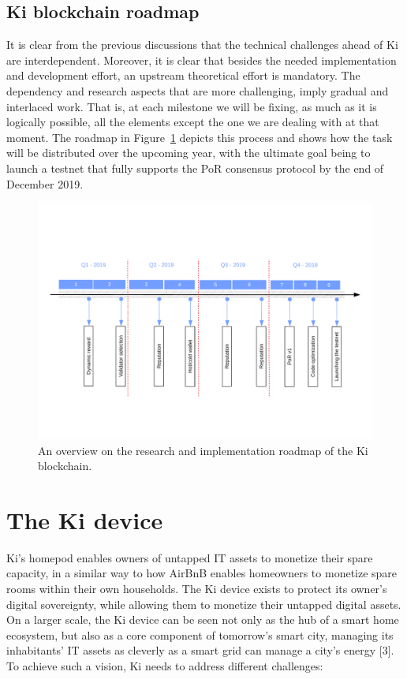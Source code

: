 \subsection{Ki blockchain roadmap}
\label{sec:kiblockchainroad}
It is clear from the previous discussions that the technical challenges ahead of Ki are interdependent. Moreover, it is clear that besides the needed implementation and development effort, an upstream theoretical effort is mandatory. The dependency and research aspects that are more challenging, imply gradual and interlaced work. That is, at each milestone we will be fixing, as much as it is logically possible, all the elements except the one we are dealing with at that moment. The roadmap in Figure~\ref{fig:roadmap} depicts this process and shows how the task will be distributed over the upcoming year, with the ultimate goal being to launch a testnet that fully supports the PoR consensus protocol by the end of December 2019.
\begin{figure}[h]
	\includegraphics[width=\linewidth, trim= 1cm 3cm 1cm 3.5cm, clip]{Figures/Roadmap_f.pdf}
	\caption{An overview on the research and implementation roadmap of the Ki blockchain.}
	\label{fig:roadmap}
\end{figure}
\section{The Ki device}
\label{sec:kidevice}
Ki's homepod enables owners of untapped IT assets to monetize their spare capacity, in a similar way to how AirBnB enables homeowners to monetize spare rooms within their own households. The Ki device exists to protect its owner's digital sovereignty, while allowing them to monetize their untapped digital assets. On a larger scale, the Ki device can be seen not only as the hub of a smart home ecosystem, but also as a core component of tomorrow's smart city, managing its inhabitants' IT assets as cleverly as a smart grid can manage a city's energy [3]. To achieve such a vision, Ki needs to address different challenges:		

